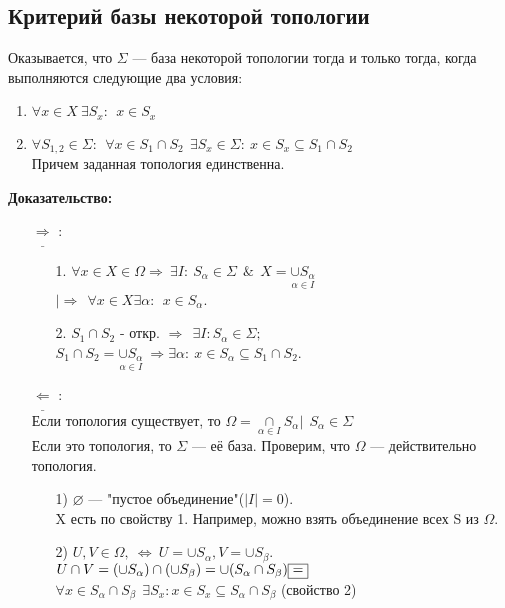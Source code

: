 \documentclass[10pt]{report}
\begin{document}
\begin{spacing}{1.5}
\subsection{Критерий базы некоторой топологии}
Оказывается, что $\Sigma$ --- база некоторой топологии тогда и только тогда, когда выполняются следующие два условия:
\begin{enumerate}
\item $\forall x\in X ~\exists S_{x}:~~x\in S_{x}$
\item $\forall S_{1,2}\in \Sigma: ~~\forall x\in S_{1}\cap S_{2}~~ \exists S_{x}\in\Sigma:~x\in S_{x}\subseteq S_{1}\cap S_{2}$
\\ Причем заданная топология единственна.
\end{enumerate}
 \textbf{Доказательство:}
\begin{enumerate}
\item[$\underline{\Rightarrow}$]:
\begin{enumerate}
\item[1.] $\forall x\in X\in \Omega\Longrightarrow~\exists I:~ S_{\alpha}\in \Sigma ~~\&~~ X = \underset{\alpha\in I}{\cup S_{\alpha}} $
\\$|\Rightarrow~~ \forall x\in X \exists \alpha:~~x\in S_{\alpha}$.
\item[2.] $S_{1}\cap S_{2}$  - откр. $\Longrightarrow~~\exists I: S_{\alpha}\in\Sigma;$\\
$S_{1}\cap S_{2}=\underset{\alpha\in I}{\cup S_{\alpha}}~\Longrightarrow \exists\alpha:~x\in S_{\alpha}\subseteq S_{1}\cap S_{2}$. 
\end{enumerate}
\item[$\underline{\Leftarrow}$]:
\\ Если топология существует, то $\Omega = {\underset{\alpha\in I}{\cap}S_{\alpha}|~~S_{\alpha}\in\Sigma}$
\\ Если это топология, то $\Sigma$ --- её база. Проверим, что $\Omega$ --- действительно топология.
\begin{enumerate}
\item[1)] $\varnothing$ --- "пустое объединение"($|I|=0$).
\\X есть по свойству 1. Например, можно взять объединение всех S из $\Omega$.
\item[2)]$U, V\in\Omega,~\Longleftrightarrow ~ U=\cup S_{\alpha}, V = \cup S_{\beta}$.
\\ $U\cap V =(\cup S_{\alpha})\cap(\cup S_{\beta}) = \cup(S_{\alpha}\cap S_{\beta})\fbox{=} $
\\ $\forall x\in S_{\alpha}\cap S_{\beta}~~\exists S_{x}: x\in S_{x}\subseteq S_{\alpha}\cap S_{\beta}$      (свойство 2)

\end{enumerate}
\end{enumerate}
\end{spacing}
\end{document}

